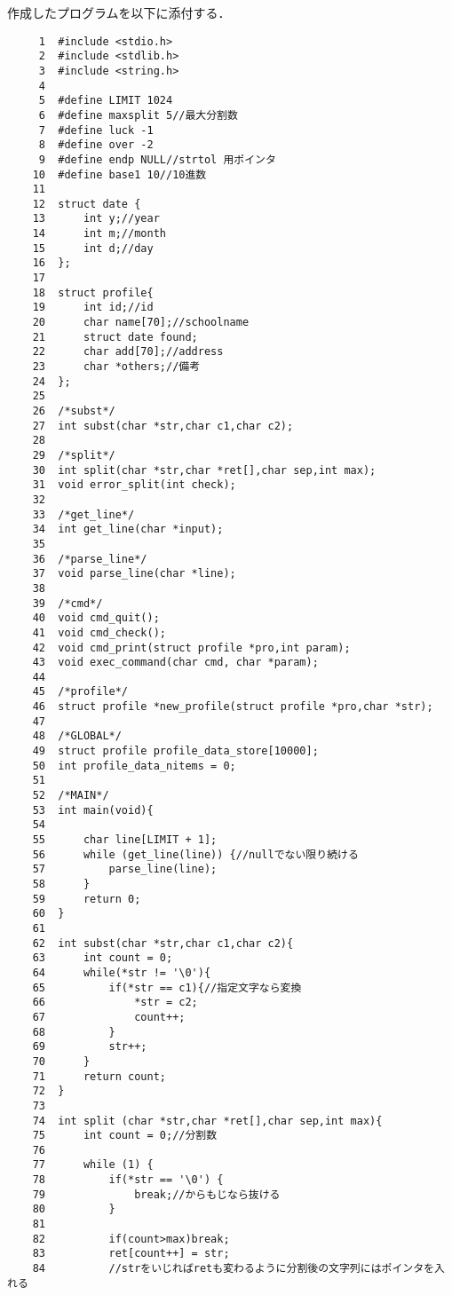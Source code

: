 \documentclass[a4j,11pt]{jarticle}
\begin{document}
作成したプログラムを以下に添付する．

%
%
{\fontsize{10pt}{11pt} \selectfont
\begin{verbatim}
     1  #include <stdio.h>
     2  #include <stdlib.h>
     3  #include <string.h>
     4
     5  #define LIMIT 1024
     6  #define maxsplit 5//最大分割数
     7  #define luck -1
     8  #define over -2
     9  #define endp NULL//strtol 用ポインタ
    10  #define base1 10//10進数
    11
    12  struct date {
    13      int y;//year
    14      int m;//month
    15      int d;//day
    16  };
    17
    18  struct profile{
    19      int id;//id
    20      char name[70];//schoolname
    21      struct date found;
    22      char add[70];//address
    23      char *others;//備考
    24  };
    25
    26  /*subst*/
    27  int subst(char *str,char c1,char c2);
    28
    29  /*split*/
    30  int split(char *str,char *ret[],char sep,int max);
    31  void error_split(int check);
    32
    33  /*get_line*/
    34  int get_line(char *input);
    35
    36  /*parse_line*/
    37  void parse_line(char *line);
    38
    39  /*cmd*/
    40  void cmd_quit();
    41  void cmd_check();
    42  void cmd_print(struct profile *pro,int param);
    43  void exec_command(char cmd, char *param);
    44
    45  /*profile*/
    46  struct profile *new_profile(struct profile *pro,char *str);
    47
    48  /*GLOBAL*/
    49  struct profile profile_data_store[10000];
    50  int profile_data_nitems = 0;
    51
    52  /*MAIN*/
    53  int main(void){
    54
    55      char line[LIMIT + 1];
    56      while (get_line(line)) {//nullでない限り続ける
    57          parse_line(line);
    58      }
    59      return 0;
    60  }
    61
    62  int subst(char *str,char c1,char c2){
    63      int count = 0;
    64      while(*str != '\0'){
    65          if(*str == c1){//指定文字なら変換
    66              *str = c2;
    67              count++;
    68          }
    69          str++;
    70      }
    71      return count;
    72  }
    73
    74  int split (char *str,char *ret[],char sep,int max){
    75      int count = 0;//分割数
    76
    77      while (1) {
    78          if(*str == '\0') {
    79              break;//からもじなら抜ける
    80          }
    81
    82          if(count>max)break;
    83          ret[count++] = str;
    84          //strをいじればretも変わるように分割後の文字列にはポインタを入れる

\end{verbatim}}
\end{document}
